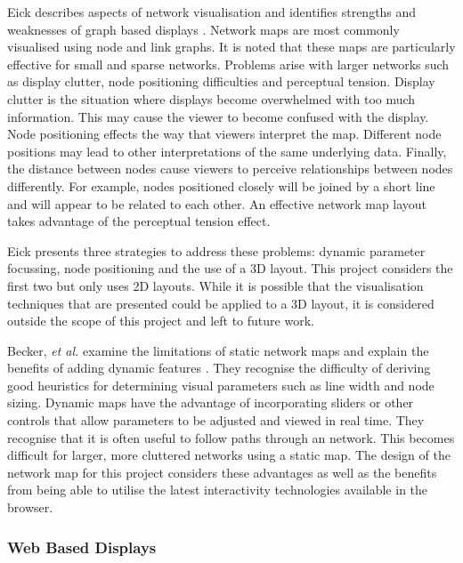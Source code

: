 \documentclass[11pt, a4paper]{article}
\begin{document}
Eick describes aspects of network visualisation and identifies strengths and
weaknesses of graph based displays \cite{Eick_1996}. Network maps are most
commonly visualised using node and link graphs. It is noted that these maps are
particularly effective for small and sparse networks. Problems arise with larger
networks such as display clutter, node positioning difficulties and perceptual
tension. Display clutter is the situation where displays become overwhelmed with
too much information. This may cause the viewer to become confused with the
display. Node positioning effects the way that viewers interpret the map.
Different node positions may lead to other interpretations of the same
underlying data. Finally, the distance between nodes cause viewers to perceive
relationships between nodes differently. For example, nodes positioned closely
will be joined by a short line and will appear to be related to each other. An
effective network map layout takes advantage of the perceptual tension effect.

Eick presents three strategies to address these problems: dynamic
parameter focussing, node positioning and the use of a 3D layout. This project
considers the first two but only uses 2D layouts. While it is possible that the
visualisation techniques that are presented could be applied to a 3D layout, it
is considered outside the scope of this project and left to future work.

Becker, \emph{et al.} examine the limitations of static network maps and explain
the benefits of adding dynamic features \cite{Becker_1990}. They recognise the
difficulty of deriving good heuristics for determining visual parameters such as
line width and node sizing. Dynamic maps have the advantage of incorporating
sliders or other controls that allow parameters to be adjusted and viewed in
real time. They recognise that it is often useful to follow paths through an
network. This becomes difficult for larger, more cluttered networks using
a static map. The design of the network map for this project considers these
advantages as well as the benefits from being able to utilise the latest
interactivity technologies available in the browser.



\subsubsection{Web Based Displays}
\label{sec:web-based-displays}
\end{document}

